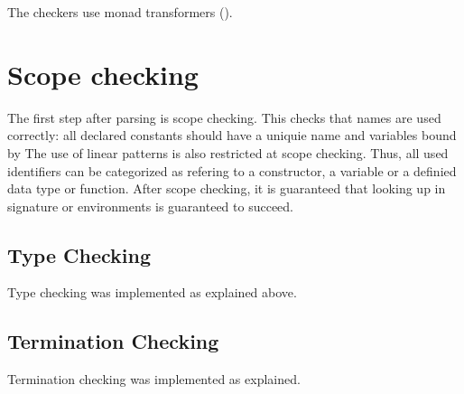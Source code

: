 The checkers use monad transformers (\cite{Grabmueller2006MonadTransformers}).

\section{Scope checking}
The first step after parsing is scope checking. This checks that names are used correctly:
all declared constants should have a uniquie name and variables bound by 
The use of linear patterns is also restricted at scope checking.
Thus, all used identifiers can be categorized as refering to a constructor, a variable or a definied data type or
function.
After scope checking, it is guaranteed that looking up in signature or environments is guaranteed to succeed.
\subsection{Type Checking}
Type checking was implemented as explained above.
\subsection{Termination Checking}
Termination checking was implemented as explained.